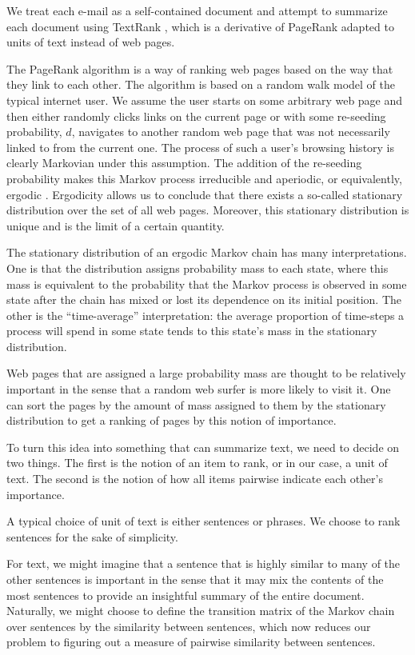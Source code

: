 We treat each e-mail as a self-contained document and attempt to summarize each document using TextRank \cite{textrank}, which is a derivative of PageRank \cite{pagerank} adapted to units of text instead of web pages.

The PageRank algorithm is a way of ranking web pages based on the way that they link to each other.
The algorithm is based on a random walk model of the typical internet user.
We assume the user starts on some arbitrary web page and then either randomly clicks links on the current page or with some re-seeding probability, $d$, navigates to another random web page that was not necessarily linked to from the current one.
The process of such a user's browsing history is clearly Markovian under this assumption.
The addition of the re-seeding probability makes this Markov process irreducible and aperiodic, or equivalently, ergodic \cite{intro-prob-models-ross}. 
Ergodicity allows us to conclude that there exists a so-called stationary distribution over the set of all web pages.
Moreover, this stationary distribution is unique and is the limit of a certain quantity.

The stationary distribution of an ergodic Markov chain has many interpretations.
One is that the distribution assigns probability mass to each state, where this mass is equivalent to the probability that the Markov process is observed in some state after the chain has mixed or lost its dependence on its initial position.
The other is the ``time-average'' interpretation: the average proportion of time-steps a process will spend in some state tends to this state's mass in the stationary distribution.

Web pages that are assigned a large probability mass are thought to be relatively important in the sense that a random web surfer is more likely to visit it.
One can sort the pages by the amount of mass assigned to them by the stationary distribution to get a ranking of pages by this notion of importance.

To turn this idea into something that can summarize text, we need to decide on two things.
The first is the notion of an item to rank, or in our case, a unit of text.
The second is the notion of how all items pairwise indicate each other's importance.

A typical choice of unit of text is either sentences or phrases.
We choose to rank sentences for the sake of simplicity.

For text, we might imagine that a sentence that is highly similar to many of the other sentences is important in the sense that it may mix the contents of the most sentences to provide an insightful summary of the entire document.
Naturally, we might choose to define the transition matrix of the Markov chain over sentences by the similarity between sentences, which now reduces our problem to figuring out a measure of pairwise similarity between sentences.

